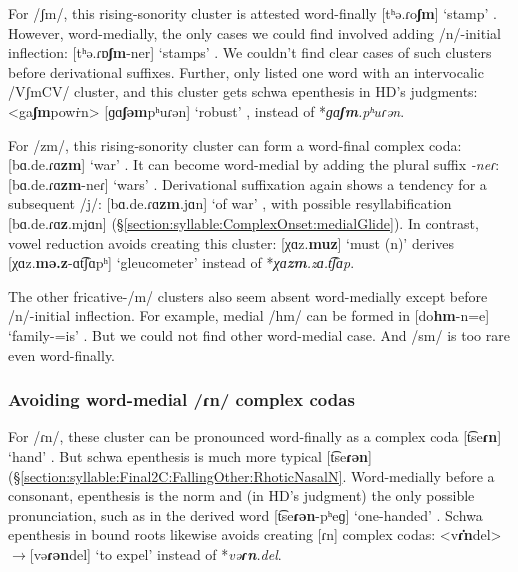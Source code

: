 	For /ʃm/, this rising-sonority cluster is attested word-finally [tʰə.ɾo\textbf{ʃm}] `stamp' . However, word-medially, the only cases we could find involved adding /n/-initial inflection: [tʰə.ɾɒ\textbf{ʃm}-ner] `stamps' . We couldn't find clear cases of such clusters before derivational suffixes. Further, \citeauthor{kouyoumdjian-1970-DictionaryArmenianEnglish} only listed one word with an intervocalic /VʃmCV/ cluster, and this cluster gets schwa epenthesis in HD's judgments: <ga\textbf{ʃm}powṙn>  [ɡɑ\textbf{ʃəm}pʰuɾən] `robust' , instead of *\textit{ɡɑ\textbf{ʃm}.pʰuɾən}. 
	
	
	For /zm/, this rising-sonority cluster can form a word-final complex coda: [bɑ.de.ɾɑ\textbf{zm}] `war' . It can become word-medial by adding the  plural suffix \textit{-neɾ}: [bɑ.de.ɾɑ\textbf{zm}-neɾ] `wars' . Derivational suffixation again shows a tendency for a subsequent /j/: [bɑ.de.ɾɑ\textbf{zm}.jɑn] `of war' , with possible resyllabification  [bɑ.de.ɾɑ\textbf{z}.mjɑn] (\S\ref{section:syllable:ComplexOnset:medialGlide}). In contrast, vowel reduction avoids creating this cluster: [χɑz.\textbf{muz}] `must (n)'  derives [χɑz.\textbf{mə.z}-ɑt͡ʃɑpʰ] `gleucometer'  instead of  *\textit{χɑ\textbf{zm}.zɑ.t͡ʃɑp}. 
	
	The other fricative-/m/ clusters also seem absent word-medially except before /n/-initial inflection. For example,  medial /hm/ can  be formed in [do\textbf{hm}-n=e] `family-{}=is' . But we could not find other word-medial case. And /sm/ is too rare even word-finally. 
	
	\subsubsection{Avoiding word-medial /ɾn/ complex codas}\label{section:syllable:OtherCodaRestrictions:AvoidMedial:rN}
	
	For /ɾn/, these cluster can be pronounced word-finally as a complex coda [t͡se\textbf{ɾn}] `hand' . But schwa epenthesis is much more typical [t͡se\textbf{ɾən}] (\S\ref{section:syllable:Final2C:FallingOther:RhoticNasalN}. Word-medially before a consonant, epenthesis is the norm and (in HD's judgment) the only possible pronunciation, such as in the derived word [t͡se\textbf{ɾən}-pʰeɡ] `one-handed' . Schwa epenthesis in bound roots likewise avoids creating [ɾn] complex codas: <v\textbf{ɾ̇n}del>$\rightarrow$[və\textbf{ɾən}del] `to expel'  instead of *\textit{və\textbf{ɾn}.del}. 
	
